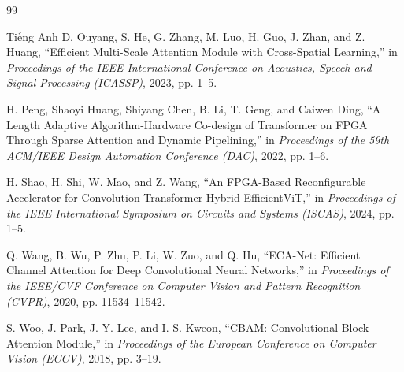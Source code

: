 \documentclass{uetgraduation}
\begin{document}
\begin{thebibliography}{99}
\begin{bibsection}{Tiếng Anh}
D. Ouyang, S. He, G. Zhang, M. Luo, H. Guo, J. Zhan, and Z. Huang, ``Efficient Multi-Scale Attention Module with Cross-Spatial Learning,'' in \textit{Proceedings of the IEEE International Conference on Acoustics, Speech and Signal Processing (ICASSP)}, 2023, pp. 1--5.

H. Peng, Shaoyi Huang, Shiyang Chen, B. Li, T. Geng, and Caiwen Ding, ``A Length Adaptive Algorithm-Hardware Co-design of Transformer on FPGA Through Sparse Attention and Dynamic Pipelining,'' in \textit{Proceedings of the 59th ACM/IEEE Design Automation Conference (DAC)}, 2022, pp. 1--6.

H. Shao, H. Shi, W. Mao, and Z. Wang, ``An FPGA-Based Reconfigurable Accelerator for Convolution-Transformer Hybrid EfficientViT,'' in \textit{Proceedings of the IEEE International Symposium on Circuits and Systems (ISCAS)}, 2024, pp. 1--5.

Q. Wang, B. Wu, P. Zhu, P. Li, W. Zuo, and Q. Hu, ``ECA-Net: Efficient Channel Attention for Deep Convolutional Neural Networks,'' in \textit{Proceedings of the IEEE/CVF Conference on Computer Vision and Pattern Recognition (CVPR)}, 2020, pp. 11534--11542.

S. Woo, J. Park, J.-Y. Lee, and I. S. Kweon, ``CBAM: Convolutional Block Attention Module,'' in \textit{Proceedings of the European Conference on Computer Vision (ECCV)}, 2018, pp. 3--19.
\end{bibsection}
\end{thebibliography}
\end{document}
